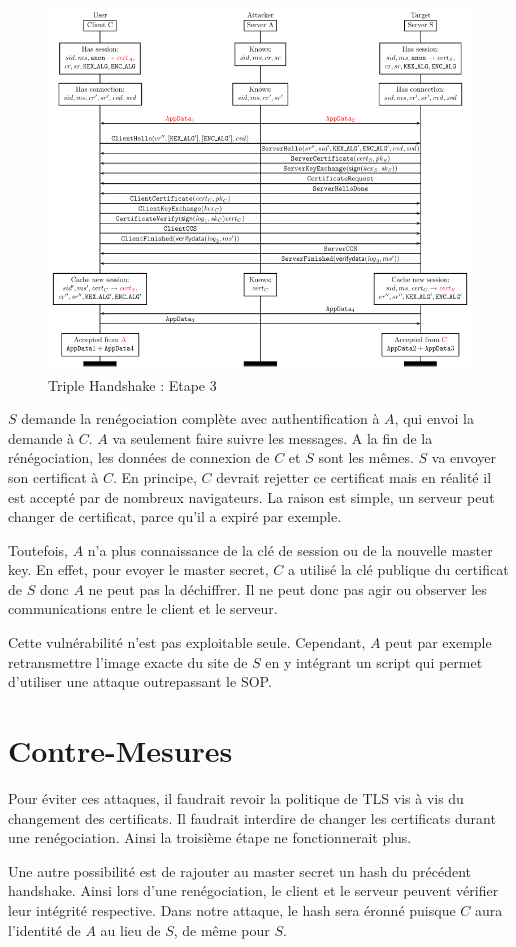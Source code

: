\begin{figure}[h]
\label{fig:hand3}
\centering
\includegraphics[scale=0.4]{Hand3}
\caption{Triple Handshake : Etape 3 }
\end{figure}

$S$ demande la renégociation complète avec authentification à $A$, qui envoi la demande à $C$. $A$ va seulement faire suivre les messages. A la
fin de la rénégociation, les données de connexion de $C$ et $S$ sont les mêmes. $S$ va envoyer son certificat à $C$.
En principe, $C$ devrait rejetter ce certificat mais en réalité il est accepté par de nombreux navigateurs. La raison
est simple, un serveur peut changer de certificat, parce qu'il a expiré par exemple.

Toutefois, $A$ n'a plus connaissance de la clé de session ou de la nouvelle master key. En effet, pour evoyer
le master secret, $C$ a utilisé la clé publique du certificat de $S$ donc $A$ ne peut pas la déchiffrer.
 Il ne peut donc pas agir ou observer les communications entre le client et le serveur. 

Cette vulnérabilité n'est pas exploitable seule. Cependant, $A$ peut par exemple retransmettre l'image exacte du site de $S$ en
y intégrant un script qui permet d'utiliser une attaque outrepassant le SOP.


\section{Contre-Mesures}
\label{sec:cmTHR}

Pour éviter ces attaques, il faudrait revoir la politique de TLS vis à vis du changement des certificats.
Il faudrait interdire de changer les certificats durant une renégociation. Ainsi la troisième étape ne 
fonctionnerait plus.

Une autre possibilité est de rajouter au master secret un hash du précédent handshake. Ainsi lors d'une
renégociation, le client et le serveur peuvent vérifier leur intégrité respective. Dans notre attaque, 
le hash sera éronné puisque $C$ aura l'identité de $A$ au lieu de $S$, de même pour $S$.

 

